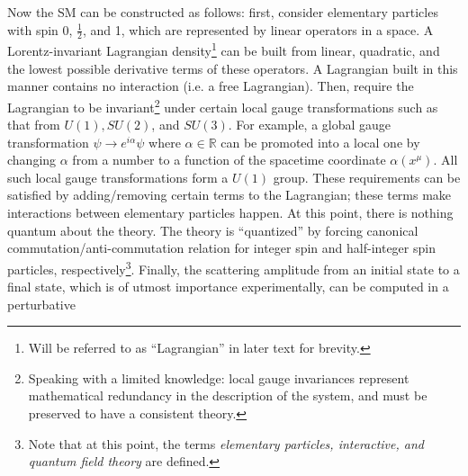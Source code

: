Now the SM can be constructed as follows:
first, consider elementary particles with spin 0, $\frac{1}{2}$, and 1,
which are represented by linear operators in a space.
A Lorentz-invariant Lagrangian density\footnote{
    Will be referred to as ``Lagrangian'' in later text for brevity.
} can be built from
linear, quadratic, and the lowest possible derivative terms of these
operators.
A Lagrangian built in this manner contains no interaction (i.e. a free
Lagrangian).
Then, require the Lagrangian to be invariant\footnote{
    Speaking with a limited knowledge: local gauge invariances represent
    mathematical redundancy in the description of the system,
    and must be preserved to have a consistent theory.
} under certain local gauge transformations
such as that from $U(1), SU(2)$, and $SU(3)$.
For example, a global gauge transformation
$\psi \rightarrow e^{i\alpha} \psi$ where $\alpha \in \mathbb{R}$
can be promoted into a local one by
changing $\alpha$ from a number to a function of the spacetime coordinate
$\alpha(x^\mu)$.
All such local gauge transformations form a $U(1)$ group.
These requirements can be satisfied by adding/removing certain terms to the
Lagrangian;
these terms make interactions between elementary particles happen.
At this point, there is nothing quantum about the theory.
The theory is ``quantized'' by forcing canonical commutation/anti-commutation
relation for integer spin and half-integer spin particles,
respectively\footnote{
    Note that at this point, the terms
    \emph{elementary particles, interactive, and quantum field theory}
    are defined.
}.
Finally, the scattering amplitude from an initial state to a final state,
which is of utmost importance experimentally,
can be computed in a perturbative
